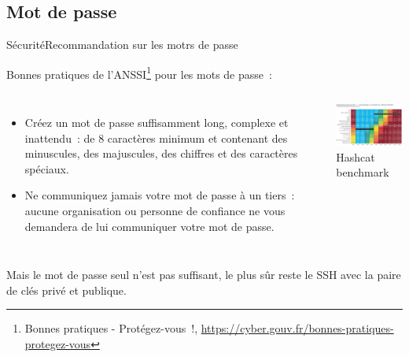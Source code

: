 \documentclass{beamer}
\begin{document}
    \subsection{Mot de passe}\label{subsec:password}
    \begin{frame}{Sécurité}{Recommandation sur les motrs de passe}
        \begin{footnotesize}
            Bonnes pratiques de l'ANSSI\footnote{Bonnes pratiques - Protégez-vous~!, \url{https://cyber.gouv.fr/bonnes-pratiques-protegez-vous}} pour les mots de passe~:
            \begin{columns}
                \begin{itemize}
                    \item Créez un mot de passe suffisamment long, complexe et inattendu~:
                    de 8 caractères minimum et contenant des minuscules, des majuscules,
                    des chiffres et des caractères spéciaux.

                    \item Ne communiquez jamais votre mot de passe à un tiers~: aucune
                    organisation ou personne de confiance ne vous demandera de lui
                    communiquer votre mot de passe.

                \end{itemize}
                \centering
                \includegraphics[width=6.5cm]{image/real-password-cracking} \\ Hashcat benchmark\footnotemark \\
            \end{columns}
            Mais le mot de passe seul n'est pas suffisant, le plus sûr reste le SSH avec la paire de clés privé et publique.
        \end{footnotesize}
    \end{frame}
\end{document}
